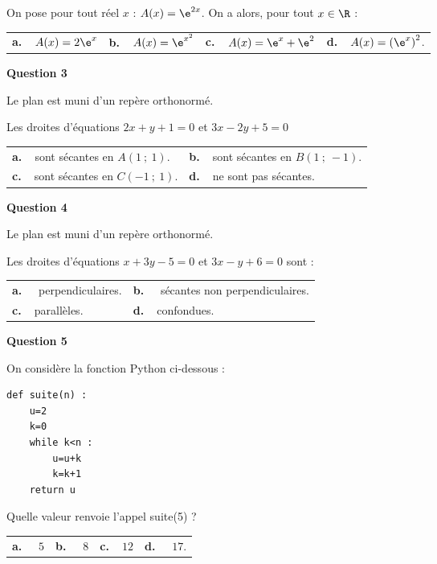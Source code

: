 \medskip 

On pose pour tout réel $x$ : $A(x) = \e^{2x}$. On a alors, pour tout $x \in \R$ :

\medskip

\begin{tabularx}{\linewidth}{*{4}{X}}
\textbf{a.~~}$A(x) = 2\e^{x}$ &\textbf{b.~~}$A(x) = \e^{x^2} $  &\textbf{c.~~}$A(x) = \e^x + \e^2$& \textbf{d.~~}$A(x) = \left(\e^x\right)^2$.
\end{tabularx}

\medskip

\textbf{Question 3}

\medskip 


Le plan est muni d'un repère orthonormé.

Les droites d'équations $2x + y + 1 = 0$ et $3x -2y + 5 = 0$

\medskip

\begin{tabularx}{\linewidth}{*{2}{X}}
\textbf{a.~~}sont sécantes en $A(1~;~1)$. & 
\textbf{b.~~}sont sécantes en $B(1~;~-1)$.\\
\textbf{c.~~}sont sécantes en $C(-1~;~1)$.& 
\textbf{d.~~}ne sont pas sécantes. 
\end{tabularx}

\medskip

\textbf{Question 4}

\medskip 

Le plan est muni d'un repère orthonormé.

Les droites d'équations $x + 3y-5 = 0$ et $3x -y+ 6 = 0 $ sont :

\medskip

\begin{tabularx}{\linewidth}{*{2}{X}}
\textbf{a.~~} perpendiculaires. &\textbf{b.~~}  sécantes non perpendiculaires.\\\textbf{c.~~}parallèles.& \textbf{d.~~}confondues.
\end{tabularx}

\medskip

\textbf{Question 5}

\medskip 

On considère la fonction Python ci-dessous :
\begin{lstlisting}[style=python]
def suite(n) :
	u=2
	k=0
	while k<n :
		u=u+k
		k=k+1
	return u
\end{lstlisting}

Quelle valeur renvoie l'appel suite(5) ?

\medskip

\begin{tabularx}{\linewidth}{*{4}{X}}
\textbf{a.~~} $5$ &\textbf{b.~~} $8$&\textbf{c.~~}$12$& \textbf{d.~~} $17$.
\end{tabularx}

\vspace{0,5cm}
